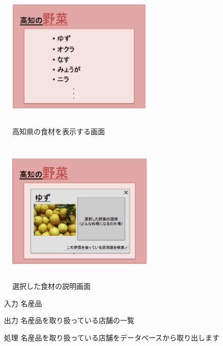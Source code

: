 \documentclass[a4j,titlepage]{jarticle}
\begin{document}
\begin {figure}[htbp]
    \begin{center}
    \includegraphics [height=7cm, width=7cm]{extrnal_design_document_image/7.eps}
    \caption {高知県の食材を表示する画面}
    \label {fig:7}
    \end{center}
\end {figure}

\begin {figure}[htbp]
    \begin{center}
    \includegraphics [height=7cm, width=7cm]{extrnal_design_document_image/8.eps}
    \caption {選択した食材の説明画面}
    \label {fig:8}
    \end{center}
\end {figure}

\begin{enumerate}
  \item [入力] 名産品
  \item [出力] 名産品を取り扱っている店舗の一覧
  \item [処理] 名産品を取り扱っている店舗をデータベースから取り出します
\end{enumerate}

\newpage
\end{document}
